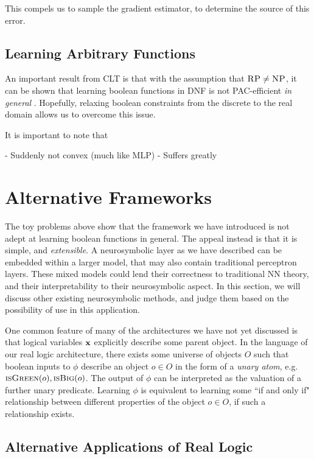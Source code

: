 This compels us to sample the gradient estimator, to determine the source of this error.

\subsection{Learning Arbitrary Functions}

An important result from CLT is that with the assumption that $\textsc{RP} \neq \textsc{NP}$, it can be shown that learning boolean functions in DNF is not PAC-efficient \textit{in general} \cite{clt}. Hopefully, relaxing boolean constraints from the discrete to the real domain allows us to overcome this issue.



It is important to note that 

- Suddenly not convex (much like MLP)
- Suffers greatly


\section{Alternative Frameworks}

The toy problems above show that the framework we have introduced is not adept at learning boolean functions in general. The appeal instead is that it is simple, and \textit{extensible}. A neurosymbolic layer as we have described can be embedded within a larger model, that may also contain traditional perceptron layers. These mixed models could lend their correctness to traditional NN theory, and their interpretability to their neurosymbolic aspect. In this section, we will discuss other existing neurosymbolic methods, and judge them based on the possibility of use in this application.

One common feature of many of the architectures we have not yet discussed is that logical variables $\mathbf{x}$ explicitly describe some parent object. In the language of our real logic architecture, there exists some universe of objects $O$ such that boolean inputs to $\phi$ describe an object $o \in O$ in the form of a \textit{unary atom}, e.g. $\textsc{isGreen}(o), \textsc{isBig}(o)$. The output of $\phi$ can be interpreted as the valuation of a further unary predicate. Learning $\phi$ is equivalent to learning some ``if and only if" relationship between different properties of the object $o\in O$, if such a relationship exists. 

\subsection{Alternative Applications of Real Logic}

